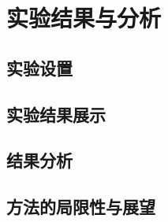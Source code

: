 \section{实验结果与分析}

\subsection{实验设置}


\subsection{实验结果展示}


\subsection{结果分析}


\subsection{方法的局限性与展望}
